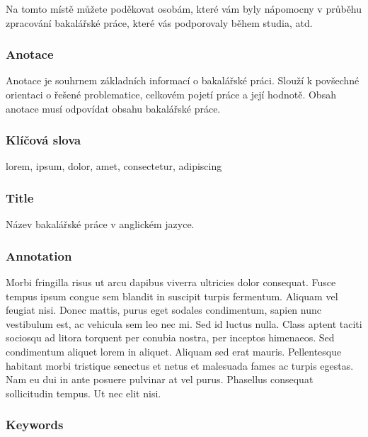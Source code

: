 \documentclass[11pt,a4paper,fleqn,titlepage,twoside,openany]{book}
\begin{document}
Na tomto místě můžete poděkovat osobám, které vám byly nápomocny v průběhu zpracování bakalářské práce, které vás podporovaly během studia, atd.

\newpage 
\thispagestyle{empty}
\subsubsection*{Anotace}

Anotace je souhrnem základních informací o bakalářské práci. Slouží k povšechné orientaci o řešené problematice, celkovém pojetí práce a její hodnotě. Obsah anotace musí odpovídat obsahu bakalářské práce.

\vspace*{0.8cm}\subsubsection*{Klíčová slova}

lorem, ipsum, dolor, amet, consectetur, adipiscing 

\vspace*{2.8cm}\subsubsection*{Title}
Název bakalářské práce v anglickém jazyce.

\vspace*{0.8cm}\subsubsection*{Annotation}

Morbi fringilla risus ut arcu dapibus viverra ultricies dolor consequat. Fusce tempus ipsum congue sem blandit in suscipit turpis fermentum. Aliquam vel feugiat nisi. Donec mattis, purus eget sodales condimentum, sapien nunc vestibulum est, ac vehicula sem leo nec mi. Sed id luctus nulla. Class aptent taciti sociosqu ad litora torquent per conubia nostra, per inceptos himenaeos. Sed condimentum aliquet lorem in aliquet. Aliquam sed erat mauris. Pellentesque habitant morbi tristique senectus et netus et malesuada fames ac turpis egestas. Nam eu dui in ante posuere pulvinar at vel purus. Phasellus consequat sollicitudin tempus. Ut nec elit nisi. 

\vspace*{0.8cm}\subsubsection*{Keywords}
\end{document}
